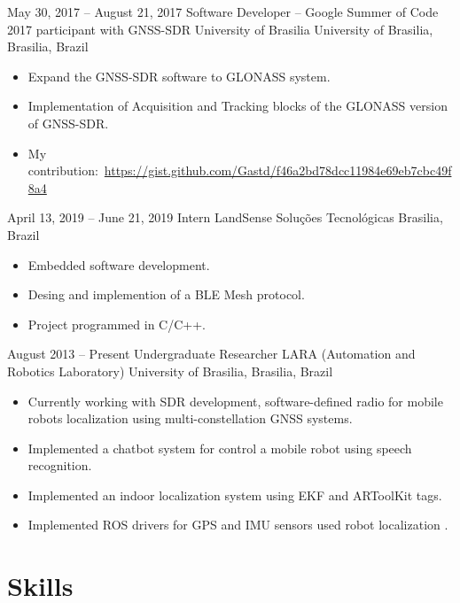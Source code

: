 \documentclass[a4paper, 10pt]{moderncv}        %
\begin{document}
\cventry
{May 30, 2017 -- August 21, 2017}
{Software Developer -- Google Summer of Code 2017 participant with GNSS-SDR}
{University of Brasilia}
{University of Brasilia, Brasilia, Brazil}
{}
{\begin{itemize}%
    \item Expand the GNSS-SDR software to GLONASS system.
    \item Implementation of Acquisition and Tracking blocks of the GLONASS version of GNSS-SDR.
    \item My contribution:~\url{https://gist.github.com/Gastd/f46a2bd78dcc11984e69eb7cbc49f8a4}
    \end{itemize}}
\cventry
{April 13, 2019 -- June 21, 2019}
{Intern}
{LandSense Soluções Tecnológicas}
{Brasilia, Brazil}
{}
{\begin{itemize}%
    \item Embedded software development.
    \item Desing and implemention of a BLE Mesh protocol.
    \item Project programmed in C/C++.
    \end{itemize}}
\cventry
{August 2013 -- Present}
{Undergraduate Researcher}
{LARA (Automation and Robotics Laboratory)}
{University of Brasilia, Brasilia, Brazil}
{}
{\begin{itemize}%
    \item Currently working with SDR development, software-defined radio for mobile robots localization using multi-constellation GNSS systems.
    \item Implemented a \textquotedbl{}chatbot\textquotedbl{} system for control a mobile robot using speech recognition.
    \item Implemented an indoor localization system using EKF and ARToolKit tags.
    \item Implemented ROS drivers for GPS and IMU sensors used robot localization .
    \end{itemize}}

\section{Skills}


\ 
\end{document}
